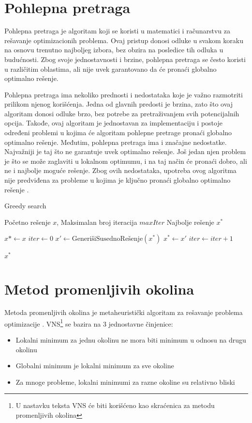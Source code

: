 \documentclass[12pt,oneside]{memoir}
\begin{document}
\section{Pohlepna pretraga}
Pohlepna pretraga je algoritam koji se koristi u matematici i računarstvu za rešavanje optimizacionih problema. Ovaj pristup donosi odluke u svakom koraku na osnovu trenutno najboljeg izbora, bez obzira na posledice tih odluka u budućnosti. Zbog svoje jednostavnosti i brzine, pohlepna pretraga se često koristi u različitim oblastima, ali nije uvek garantovano da će pronaći globalno optimalno rešenje.

Pohlepna pretraga ima nekoliko prednosti i nedostataka koje je važno razmotriti prilikom njenog korišćenja. Jedna od glavnih predosti je brzina, zato što ovaj algoritam donosi odluke brzo, bez potrebe za pretraživanjem svih potencijalnih opcija. Takođe, ovaj algoritam je jednostavan za implementaciju i postoje određeni problemi u kojima će algoritam pohlepne pretrage pronaći globalno optimalno rešenje. Međutim, pohlepna pretraga ima i značajne nedostatke. Najvažniji je taj što ne garantuje uvek optimalno rešenje. Još jedan njen problem je što se može zaglaviti u lokalnom optimumu, i na taj način će pronaći dobro, ali ne i najbolje moguće rešenje. Zbog ovih nedostataka, upotreba ovog algoritma nije predviđena za probleme u kojima je ključno pronaći globalno optimalno rešenje \cite{cormen2022}.\\

\begin{algorithm}
\caption{Greedy search}
\renewcommand{\algorithmicrequire}{\textbf{Input:}}
\renewcommand{\algorithmicensure}{\textbf{Output:}}
    \begin{algorithmic}[1]
\REQUIRE Početno rešenje $x$, Maksimalan broj iteracija $maxIter$
\ENSURE Najbolje rešenje $x^*$

\STATE $x* \gets x$
\STATE $iter \gets 0$
    \STATE $x' \gets \text{GenerišiSusednoRešenje}(x^*)$
        \STATE $x^* \gets x'$
    \ENDIF
    \STATE $iter \gets iter + 1$
\ENDWHILE

\RETURN $x^*$
\end{algorithmic}
\end{algorithm}

\section{Metod promenljivih okolina}
Metoda promenljivih okolina  je metaheuristički algoritam za rešavanje problema optimizacije \cite{mladenovic1997}. 
VNS\footnote{U nastavku teksta VNS će biti korišćeno kao skraćenica za metodu promenljivih okolina} se bazira na 3 jednostavne činjenice:
\begin{itemize}
    \item Lokalni minimum za jednu okolinu ne mora biti minimum u odnosu na drugu okolinu
    \item Globalni minimum je lokalni minimum za sve okoline
    \item Za mnoge probleme, lokalni minimumi za razne okoline su relativno bliski
\end{itemize}
\end{document}
